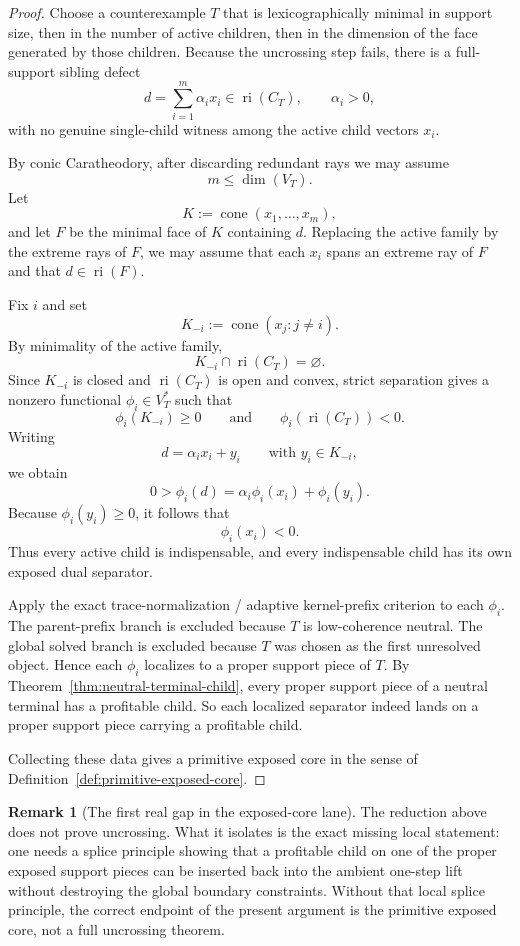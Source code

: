 \documentclass[11pt]{article}
\theoremstyle{definition}
\newtheorem{remark}[theorem]{Remark}
\newcommand{\1}{\mathbf{1}}
\begin{document}
\begin{proof}
Choose a counterexample $T$ that is lexicographically minimal in support size, then in the number of active children, then in the dimension of the face generated by those children.
Because the uncrossing step fails, there is a full-support sibling defect
\[
d=\sum_{i=1}^m \alpha_i x_i\in \operatorname{ri}(C_T),
\qquad
\alpha_i>0,
\]
with no genuine single-child witness among the active child vectors $x_i$.

By conic Caratheodory, after discarding redundant rays we may assume
\[
m\le \dim(V_T).
\]
Let
\[
K:=\operatorname{cone}(x_1,\dots,x_m),
\]
and let $F$ be the minimal face of $K$ containing $d$.
Replacing the active family by the extreme rays of $F$, we may assume that each $x_i$ spans an extreme ray of $F$ and that $d\in \operatorname{ri}(F)$.

Fix $i$ and set
\[
K_{-i}:=\operatorname{cone}(x_j:j\neq i).
\]
By minimality of the active family,
\[
K_{-i}\cap \operatorname{ri}(C_T)=\varnothing.
\]
Since $K_{-i}$ is closed and $\operatorname{ri}(C_T)$ is open and convex, strict separation gives a nonzero functional $\phi_i\in V_T^*$ such that
\[
\phi_i(K_{-i})\ge 0
\qquad\text{and}\qquad
\phi_i(\operatorname{ri}(C_T))<0.
\]
Writing
\[
d=\alpha_i x_i+y_i
\qquad\text{with } y_i\in K_{-i},
\]
we obtain
\[
0>\phi_i(d)=\alpha_i\phi_i(x_i)+\phi_i(y_i).
\]
Because $\phi_i(y_i)\ge 0$, it follows that
\[
\phi_i(x_i)<0.
\]
Thus every active child is indispensable, and every indispensable child has its own exposed dual separator.

Apply the exact trace-normalization / adaptive kernel-prefix criterion to each $\phi_i$.
The parent-prefix branch is excluded because $T$ is low-coherence neutral.
The global solved branch is excluded because $T$ was chosen as the first unresolved object.
Hence each $\phi_i$ localizes to a proper support piece of $T$.
By Theorem~\ref{thm:neutral-terminal-child}, every proper support piece of a neutral terminal has a profitable child.
So each localized separator indeed lands on a proper support piece carrying a profitable child.

Collecting these data gives a primitive exposed core in the sense of Definition~\ref{def:primitive-exposed-core}.
\end{proof}

\begin{remark}[The first real gap in the exposed-core lane]\label{rem:primitive-core-gap}
The reduction above does not prove uncrossing.
What it isolates is the exact missing local statement:
one needs a splice principle showing that a profitable child on one of the proper exposed support pieces can be inserted back into the ambient one-step lift without destroying the global boundary constraints.
Without that local splice principle, the correct endpoint of the present argument is the primitive exposed core, not a full uncrossing theorem.
\end{remark}
\end{document}
